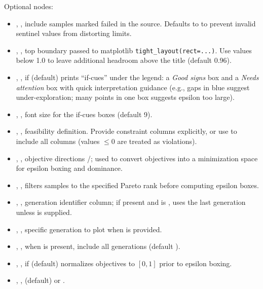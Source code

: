 Optional nodes:
\begin{itemize}
  \item {}, , include samples marked failed in the source. Defaults to  to prevent invalid sentinel values from distorting limits.
  \item {}, , top boundary passed to matplotlib \texttt{tight\_layout(rect=...)}. Use values below 1.0 to leave additional headroom above the title (default 0.96).
  \item {}, , if  (default) prints ``if-cues'' under the legend: a \emph{Good signs} box and a \emph{Needs attention} box with quick interpretation guidance (e.g., gaps in blue suggest under-exploration; many points in one box suggests epsilon too large).
  \item {}, , font size for the if-cues boxes (default 9).
  \item {}, , feasibility definition. Provide constraint columns explicitly, or use  to include all  columns (values \(\le 0\) are treated as violations).
  \item {}, , objective directions /; used to convert objectives into a minimization space for epsilon boxing and dominance.
  \item {}, , filters samples to the specified Pareto rank before computing epsilon boxes.
  \item {}, , generation identifier column; if present and  is , uses the last generation unless  is supplied.
  \item {}, , specific generation to plot when  is provided.
  \item {}, , when  is present, include all generations (default ).
  \item {}, , if  (default) normalizes objectives to \([0,1]\) prior to epsilon boxing.
  \item {}, ,  (default) or .

\end{itemize}
